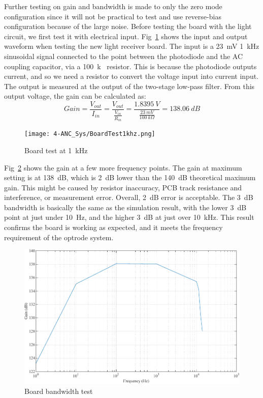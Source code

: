 Further testing on gain and bandwidth is made to only the zero mode configuration since it will not be practical to test and use reverse-bias configuration because of the large noise.  Before testing the board with the light circuit, we first test it with electrical input.  Fig~\ref{fig_BoardTest1khz} shows the input and output waveform when testing the new light receiver board.  The input is a \qty{23}{mV} \qty{1}{kHz} sinusoidal signal connected to the point between the photodiode and the AC coupling capacitor, via a \qty{100}{k\Omega} resistor.  This is because the photodiode outputs current, and so we need a resistor to convert the voltage input into current input.  The output is measured at the output of the two-stage low-pass filter.  From this output voltage, the gain can be calculated as:
$$Gain=\frac{V_{out}}{I_{in}}=\frac{V_{out}}{\frac{V_{in}}{R_{in}}}=\frac{\qty{1.8395}{V}}{\frac{\qty{23}{mV}}{\qty{100}{k\Omega}}}=\qty{138.06}{dB}$$

\begin{figure}[!ht]
\centering
\texttt{[image: 4-ANC\_Sys/BoardTest1khz.png]}
\caption{Board test at \qty{1}{kHz}}
\label{fig_BoardTest1khz}
\end{figure}

Fig~\ref{fig_BoardBandwidth} shows the gain at a few more frequency points.  The gain at maximum setting is at \qty{138}{dB}, which is \qty{2}{dB} lower than the \qty{140}{dB} theoretical maximum gain.  This might be caused by resistor inaccuracy, PCB track resistance and interference, or measurement error.  Overall, \qty{2}{dB} error is acceptable.  The \qty{3}{dB} bandwidth is basically the same as the simulation result, with the lower \qty{3}{dB} point at just under \qty{10}{Hz}, and the higher \qty{3}{dB} at just over \qty{10}{kHz}.  This result confirms the board is working as expected, and it meets the frequency requirement of the optrode system.

\begin{figure}[!ht]
\centering
\includegraphics[scale=0.9]{4-ANC_Sys/BoardBandwidth.pdf}
\caption{Board bandwidth test}
\label{fig_BoardBandwidth}
\end{figure}




